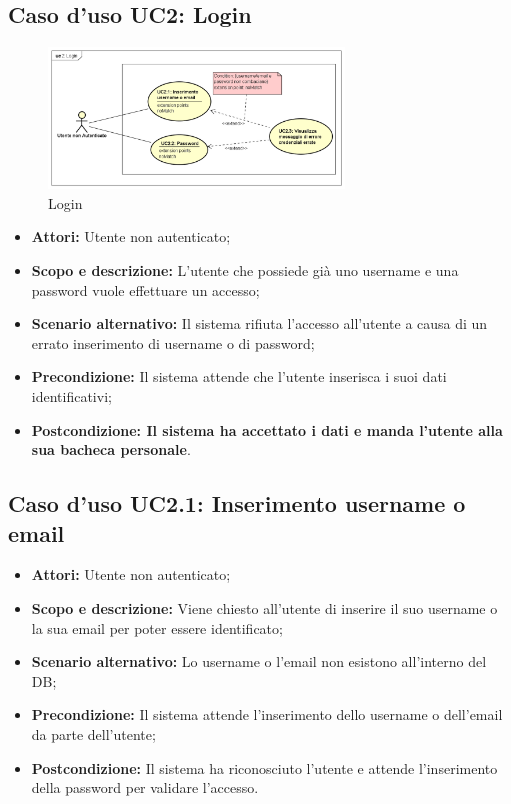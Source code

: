 \documentclass[12pt,a4paper,titlepage]{article}
\begin{document}
\subsection{Caso d'uso UC2: Login}
\begin{figure}[H]
	\centering
	\includegraphics[width=0.7\textwidth]{UseCase/Login}
	\caption{Login}
\end{figure}
\begin{itemize}
	\item \textbf{Attori:} Utente non autenticato;
	\item \textbf{Scopo e descrizione:} L'utente che possiede già uno username e una password vuole effettuare un accesso;
	\item \textbf{Scenario alternativo: }Il sistema rifiuta l'accesso all'utente a causa di un errato inserimento di username o di password;
	\item \textbf{Precondizione: }Il sistema attende che l'utente inserisca i suoi dati identificativi;
	\item \textbf{Postcondizione: Il sistema ha accettato i dati e manda l'utente alla sua bacheca personale}.
\end{itemize}
\subsection{Caso d'uso UC2.1: Inserimento username o email}
\begin{itemize}
	\item \textbf{Attori: }Utente non autenticato;
	\item \textbf{Scopo e descrizione: }Viene chiesto all'utente di inserire il suo username o la sua email per poter essere identificato;
	\item \textbf{Scenario alternativo: }Lo username o l'email non esistono all'interno del DB;
	\item \textbf{Precondizione: }Il sistema attende l'inserimento dello username o dell'email da parte dell'utente;
	\item \textbf{Postcondizione: }Il sistema ha riconosciuto l'utente e attende l'inserimento della password per validare l'accesso.
\end{itemize}
\end{document}
